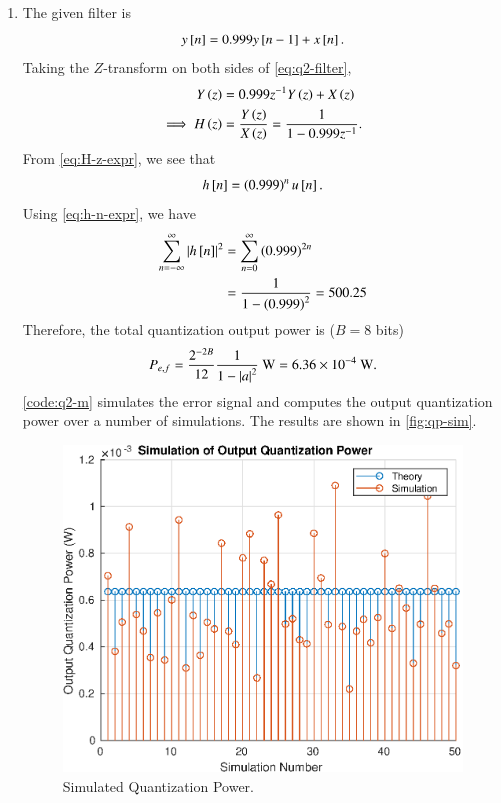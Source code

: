 \documentclass[journal,12pt,twocolumn]{IEEEtran}
\begin{document}
\begin{enumerate}
    \item The given filter is
    \begin{equation}
        y{}\left[n\right] = 0.999y{}\left[n-1\right] + x{}\left[n\right].
        \label{eq:q2-filter}
    \end{equation}
    Taking the \(Z\)-transform on both sides of \eqref{eq:q2-filter},
    \begin{align}
        Y\left(z\right) &= 0.999z^{-1}Y\left(z\right) + X\left(z\right) \\
        \implies H\left(z\right) &= \frac{Y\left(z\right)}{X\left(z\right)} = \frac{1}{1 - 0.999z^{-1}}.
        \label{eq:H-z-expr}
    \end{align}
    From \eqref{eq:H-z-expr}, we see that
    \begin{equation}
        h{}\left[n\right] = \left(0.999\right)^nu{}\left[n\right].
        \label{eq:h-n-expr}
    \end{equation}
    Using \eqref{eq:h-n-expr}, we have
    \begin{align}
        \sum_{n=-\infty}^\infty\left\vert h{}\left[n\right]\right\vert^2 &= \sum_{n=0}^\infty \left(0.999\right)^{2n} \\
                                                  &= \frac{1}{1 - \left(0.999\right)^2} = 500.25
                                                  \label{eq:sum-h2-n}
    \end{align}
    Therefore, the total quantization output power is (\(B=8\) bits)
    \begin{equation}
        P_{e,f} = \frac{2^{-2B}}{12}\frac{1}{1-\left\vert a\right\vert^2} \text{ W} = 6.36\times 10^{-4}\text{ W}.
    \end{equation}
    \autoref{code:q2-m} simulates the error signal and computes the output
    quantization power over a number of simulations. The results are shown in
    \autoref{fig:qp-sim}.

    \begin{figure}[!ht]
        \centering
        \includegraphics[width=\columnwidth]{figs/q2_fig1.eps}
        \caption{Simulated Quantization Power.}
        \label{fig:qp-sim}
    \end{figure}


\end{enumerate}
\end{document}
